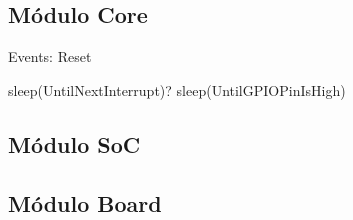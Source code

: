 \subsection{Módulo Core}

Events:
Reset


sleep(UntilNextInterrupt)?
sleep(UntilGPIOPinIsHigh)

\subsection{Módulo SoC}


\subsection{Módulo Board}



%
%
%
%
%
%
%


